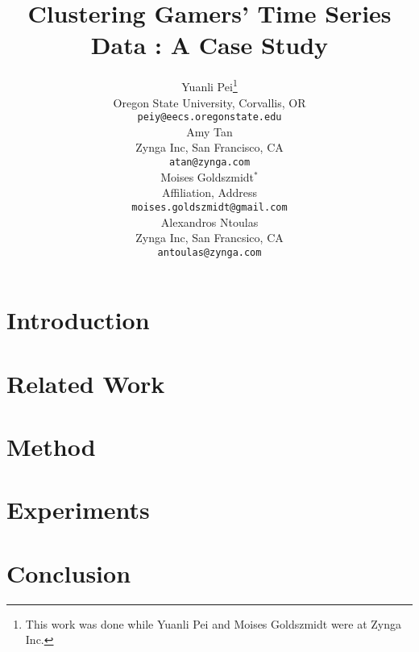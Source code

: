 \documentclass{article} %
\title{Clustering Gamers' Time Series Data : A Case Study}
\author{
Yuanli Pei\thanks{This work was done while Yuanli Pei and Moises Goldszmidt were at Zynga Inc.} \\
Oregon State University, Corvallis, OR\\
\texttt{peiy@eecs.oregonstate.edu} \\
\And
Amy Tan\\
Zynga Inc, San Francisco, CA\\
\texttt{atan@zynga.com} \\
\AND
Moises Goldszmidt$^\ast$ \\
Affiliation, Address \\
\texttt{moises.goldszmidt@gmail.com} \\
\And
Alexandros Ntoulas\\
Zynga Inc, San Francsico, CA \\
\texttt{antoulas@zynga.com} 
}
\begin{document}
\maketitle

\begin{abstract}
%

\end{abstract}


\section{Introduction}
%


\section{Related Work}


\section{Method}


\section{Experiments}


\section{Conclusion}




\small{
    {}
    
}



\end{document}
